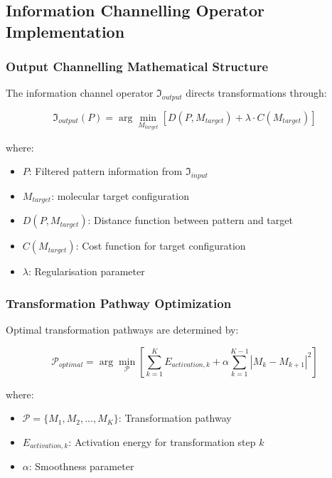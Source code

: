 \documentclass[12pt,a4paper]{article}
\begin{document}
\subsection{Information Channelling Operator Implementation}

\subsubsection{Output Channelling Mathematical Structure}

The information channel operator $\mathfrak{I}_{output}$ directs transformations through:

\begin{equation}
\mathfrak{I}_{output}(P) = \arg\min_{M_{target}} \left[ D(P, M_{target}) + \lambda \cdot C(M_{target}) \right]
\end{equation}

where:
\begin{itemize}
\item $P$: Filtered pattern information from $\mathfrak{I}_{input}$
\item $M_{target}$: molecular target configuration
\item $D(P, M_{target})$: Distance function between pattern and target
\item $C(M_{target})$: Cost function for target configuration
\item $\lambda$: Regularisation parameter
\end{itemize}

\subsubsection{Transformation Pathway Optimization}

Optimal transformation pathways are determined by:

\begin{equation}
\mathcal{P}_{optimal} = \arg\min_{\mathcal{P}} \left[ \sum_{k=1}^{K} E_{activation,k} + \alpha \sum_{k=1}^{K-1} |M_k - M_{k+1}|^2 \right]
\end{equation}

where:
\begin{itemize}
\item $\mathcal{P} = \{M_1, M_2, ..., M_K\}$: Transformation pathway
\item $E_{activation,k}$: Activation energy for transformation step $k$
\item $\alpha$: Smoothness parameter
\end{itemize}
\end{document}
